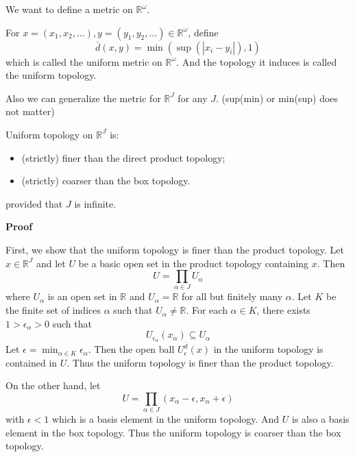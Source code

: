 \documentclass[main.tex]{subfiles}
\begin{document}
\par We want to define a metric on $\mathbb{R}^{\omega}$. 
\begin{definition}
    For $x = (x_1, x_2, \ldots), y = (y_1, y_2, \ldots) \in \mathbb{R}^{\omega}$, define
    \begin{equation}
        \bar{d}(x, y) = \min(\sup(|x_i - y_i|), 1)
    \end{equation}
    which is called the uniform metric on $\mathbb{R}^{\omega}$. And the topology it induces is called the uniform topology.
\end{definition}
Also we can generalize the metric for $\mathbb{R}^{J}$ for any $J$. (sup(min) or min(sup) does not matter)
\begin{theorem}
    Uniform topology on $\mathbb{R}^{J}$ is: 
    \begin{itemize}
        \item (strictly) finer than the direct product topology;
        \item (strictly) coarser than the box topology. 
    \end{itemize}
\end{theorem}
provided that $J$ is infinite.
\par \noindent \textbf{Proof} 
\par First, we show that the uniform topology is finer than the product topology. Let $x \in \mathbb{R}^{J}$ and let $U$ be a basic open set in the product topology containing $x$. Then
\begin{equation}
    U = \prod_{\alpha \in J} U_{\alpha}
\end{equation}
where $U_{\alpha}$ is an open set in $\mathbb{R}$ and $U_{\alpha} = \mathbb{R}$ for all but finitely many $\alpha$. Let $K$ be the finite set of indices $\alpha$ such that $U_{\alpha} \neq \mathbb{R}$. For each $\alpha \in K$, there exists $1 > \epsilon_{\alpha} > 0$ such that
\begin{equation}
    U_{\epsilon_{\alpha}}(x_{\alpha}) \subseteq U_{\alpha}
\end{equation}
Let $\epsilon = \min_{\alpha \in K} \epsilon_{\alpha}$. Then the open ball $U_{\epsilon}^{\bar{d}}(x)$ in the uniform topology is contained in $U$. Thus the uniform topology is finer than the product topology. 
\par On the other hand, let 
\begin{equation}
    U = \prod_{\alpha \in J} (x_{\alpha} - \epsilon, x_{\alpha} + \epsilon)
\end{equation}
with $\epsilon < 1$ which is a basis element in the uniform topology. And $U$ is also a basis element in the box topology. Thus the uniform topology is coarser than the box topology.
\end{document}
